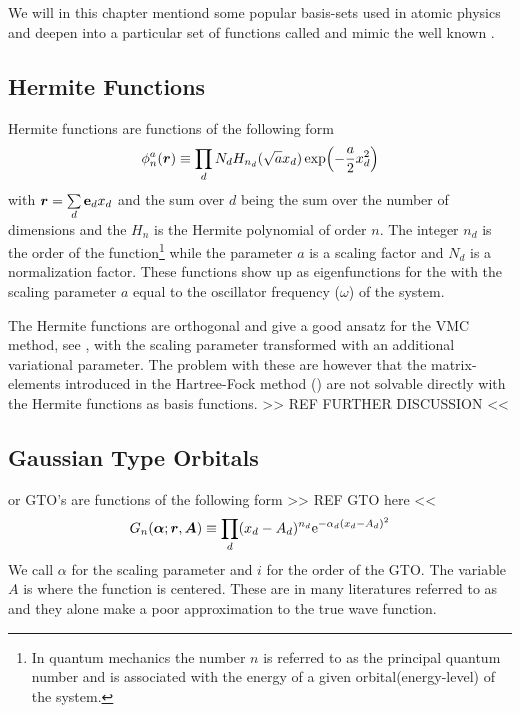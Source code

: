 \chapter{\label{chapter:4}}
    We will in this chapter mentiond some popular basis-sets used in atomic
    physics and deepen into a particular set of functions called
     and mimic the well known .

\section{Hermite Functions}
    Hermite functions are functions of the following form
        \begin{equation}
            \phi^a_n(\boldsymbol{{r}}) \equiv \prod_d N_d
            H_{n_d}(\sqrt{a}x_d)\exp(-\frac{a}{2}x^2_d)
            \label{eq:HermiteFunc}
        \end{equation}
    with $\boldsymbol{{r}} = \sum\limits_d \boldsymbol{{\mathrm{e}}}_dx_d$ and the sum over $d$ being
    the sum over the number of dimensions and the $H_n$ is the Hermite
    polynomial of order $n$. The integer $n_d$ is the order of the
    function\footnote{In quantum mechanics the number $n$ is referred to as the
    principal quantum number and is associated with the energy of a given
    orbital(energy-level) of the system.} while the parameter $a$ is a scaling
    factor and $N_d$ is a normalization factor. These functions show up as
    eigenfunctions for the \cite{GriffQuan} with the scaling parameter $a$ equal to the
    oscillator frequency ($\omega$) of the system.

    The Hermite functions are orthogonal and give a good ansatz for the VMC
    method, see , with the scaling parameter transformed with an
    additional variational parameter. The problem with these are however that
    the matrix-elements introduced in the Hartree-Fock method
    () are not solvable directly with the Hermite functions
    as basis functions. >> REF FURTHER DISCUSSION <<

\section{Gaussian Type Orbitals}
     or GTO's are functions of the following form
    >> REF GTO here <<
        \begin{equation}
            G_n(\boldsymbol{{\alpha}};\boldsymbol{{r}},\boldsymbol{{A}}) \equiv \prod_d (x_d-A_d)^{n_d}
            \mathrm{e}^{-\alpha_d (x_d-A_d)^2}
            \label{eq:GTOdef1d}
        \end{equation}
    We call $\alpha$ for the scaling parameter and $i$ for the order of the
    GTO. The variable $A$ is where the function is centered. These are in many
    literatures referred to as  and they alone
    make a poor approximation to the true wave function.

